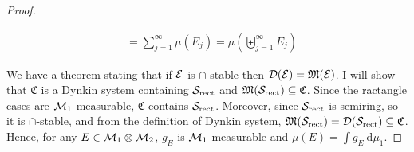 \begin{proof}
\begin{enumerate}[(i)]
\begin{align*}
      &= \sum_{j=1}^\infty \mu(E_j) = \mu\left(\biguplus_{j=1}^\infty E_j\right)
    \end{align*}
  \end{enumerate}
  We have a theorem stating that if $\mathcal E$ is $\cap$-stable then $\mathcal{D}(\mathcal E) = \mathfrak M(\mathcal E)$. 
  I will show that $\mathfrak{C}$ is a Dynkin system containing $\mathcal S_{\text{rect}}$ and $\mathfrak M(\mathcal S_{\text{rect}}) \subseteq \mathfrak{C}$.
  Since the ractangle cases are $\mathcal M_1$-measurable, $\mathfrak{C}$ contains $\mathcal S_{\text{rect}}$. Moreover, since $\mathcal S_{\text{rect}}$ is 
  semiring, so it is $\cap$-stable,
  and from the definition of Dynkin system, 
  $\mathfrak M(\mathcal S_{\text{rect}}) = \mathcal{D}(\mathcal S_{\text{rect}}) \subseteq \mathfrak{C}$. 
  Hence, for any $E \in \mathcal M_1 \otimes \mathcal M_2$, $g_E$ is $\mathcal M_1$-measurable and $\mu(E) = \int g_E \ \mathrm{d}\mu_1$.










\end{proof}
